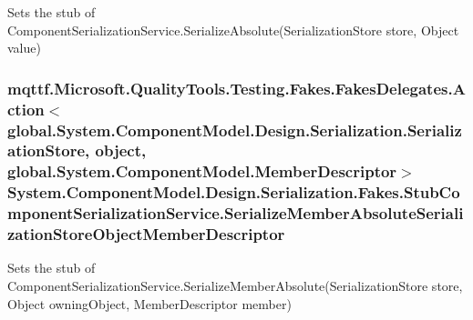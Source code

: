Sets the stub of Component\-Serialization\-Service.\-Serialize\-Absolute(\-Serialization\-Store store, Object value)

\hypertarget{class_system_1_1_component_model_1_1_design_1_1_serialization_1_1_fakes_1_1_stub_component_serialization_service_ac327db861a75c2327f6f522723a6975d}{
\subsubsection[{Serialize\-Member\-Absolute\-Serialization\-Store\-Object\-Member\-Descriptor}]{\setlength{\rightskip}{0pt plus 5cm}mqttf.\-Microsoft.\-Quality\-Tools.\-Testing.\-Fakes.\-Fakes\-Delegates.\-Action$<$global.\-System.\-Component\-Model.\-Design.\-Serialization.\-Serialization\-Store, object, global.\-System.\-Component\-Model.\-Member\-Descriptor$>$ System.\-Component\-Model.\-Design.\-Serialization.\-Fakes.\-Stub\-Component\-Serialization\-Service.\-Serialize\-Member\-Absolute\-Serialization\-Store\-Object\-Member\-Descriptor}}\label{class_system_1_1_component_model_1_1_design_1_1_serialization_1_1_fakes_1_1_stub_component_serialization_service_ac327db861a75c2327f6f522723a6975d}


Sets the stub of Component\-Serialization\-Service.\-Serialize\-Member\-Absolute(\-Serialization\-Store store, Object owning\-Object, Member\-Descriptor member)

